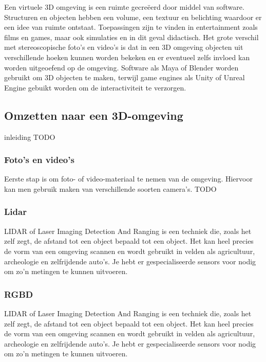 Een virtuele 3D omgeving is een ruimte gecreëerd door middel van software. Structuren en objecten hebben een volume, een textuur en belichting waardoor er een idee van ruimte ontstaat. Toepassingen zijn te vinden in entertainment zoals films en games, maar ook simulaties en in dit geval didactisch. Het grote verschil met stereoscopische foto’s en video’s is dat in een 3D omgeving objecten uit verschillende hoeken kunnen worden bekeken en er eventueel zelfs invloed kan worden uitgeoefend op de omgeving. Software als Maya of Blender worden gebruikt om 3D objecten te maken, terwijl game engines als Unity of Unreal Engine gebuikt worden om de interactiviteit te verzorgen. 



\subsection{Omzetten naar een 3D-omgeving}

inleiding TODO

\subsubsection{Foto's en video's}
Eerste stap is om foto- of video-materiaal te nemen van de omgeving. Hiervoor kan men gebruik maken van verschillende soorten camera's. TODO

\subsubsection{Lidar}

LIDAR of Laser Imaging Detection And Ranging is een techniek die, zoals het zelf zegt, de afstand tot een object bepaald tot een object. Het kan heel precies de vorm van een omgeving scannen en wordt gebruikt in velden als agricultuur, archeologie en zelfrijdende auto’s. Je hebt er gespecialiseerde sensors voor nodig om zo’n metingen te kunnen uitvoeren.

\subsubsection{RGBD}

LIDAR of Laser Imaging Detection And Ranging is een techniek die, zoals het zelf zegt, de afstand tot een object bepaald tot een object. Het kan heel precies de vorm van een omgeving scannen en wordt gebruikt in velden als agricultuur, archeologie en zelfrijdende auto’s. Je hebt er gespecialiseerde sensors voor nodig om zo’n metingen te kunnen uitvoeren.

